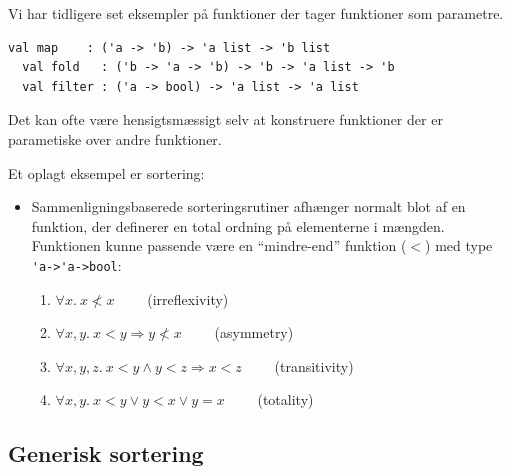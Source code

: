 \documentclass[rgb]{beamer}
\begin{document}
\begin{frame}[fragile]
\begin{footnotesize}

  \vspace{1ex}

  Vi har tidligere set eksempler på funktioner der tager funktioner
  som parametre.


\begin{lstlisting}[numbers=none,frame=none,mathescape]
  val map    : ('a -> 'b) -> 'a list -> 'b list
  val fold   : ('b -> 'a -> 'b) -> 'b -> 'a list -> 'b
  val filter : ('a -> bool) -> 'a list -> 'a list
\end{lstlisting}

Det kan ofte være hensigtsmæssigt selv at konstruere funktioner der er
parametiske over andre funktioner.

\sp

Et oplagt eksempel er sortering:

\begin{itemize}
\item Sammenligningsbaserede sorteringsrutiner afhænger normalt blot
  af en funktion, der definerer en total ordning på elementerne i
  mængden. Funktionen kunne passende være en ``mindre-end'' funktion ($<$)
  med type \lstinline{'a->'a->bool}:
  \begin{enumerate}
  \item $\forall x. ~x \not < x$ ~~~~(irreflexivity)
  \item $\forall x,y. ~x < y \Rightarrow y \not < x$ ~~~~(asymmetry)
  \item $\forall x,y,z. ~x < y \wedge y < z \Rightarrow x < z$ ~~~~(transitivity)
  \item $\forall x,y. ~x < y \vee y < x \vee y = x$ ~~~~(totality)
  \end{enumerate}
\end{itemize}

\end{footnotesize}
\end{frame}

\subsection{Generisk sortering}
\end{document}
